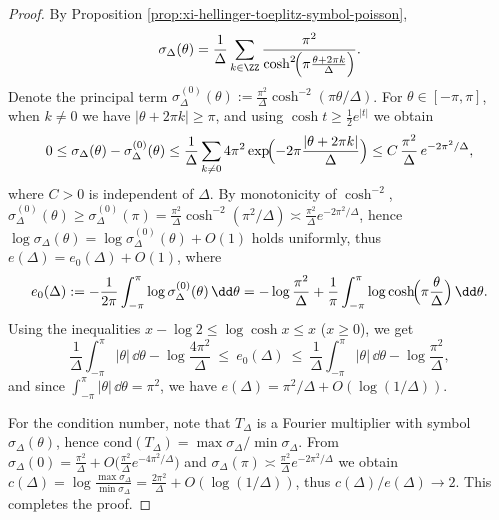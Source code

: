 \begin{proof}
By Proposition \ref{prop:xi-hellinger-toeplitz-symbol-poisson},
\[
\sigma_\Delta(\theta)=\frac{1}{\Delta}\sum_{k\in\ZZ}\frac{\pi^{2}}{\cosh^{2}\!\Bigl(\pi\frac{\theta+2\pi k}{\Delta}\Bigr)}.
\]
Denote the principal term
\(
\sigma_\Delta^{(0)}(\theta):=\frac{\pi^{2}}{\Delta}\cosh^{-2}(\pi\theta/\Delta)
\).
For \(\theta\in[-\pi,\pi]\), when \(k\neq0\) we have \(|\theta+2\pi k|\ge\pi\), and using \(\cosh t\ge \tfrac12 e^{|t|}\) we obtain
\[
0\le \sigma_\Delta(\theta)-\sigma_\Delta^{(0)}(\theta)
\le \frac{1}{\Delta}\sum_{k\neq0}4\pi^{2}\exp\!\Bigl(-2\pi\frac{|\theta+2\pi k|}{\Delta}\Bigr)
\le C\,\frac{\pi^{2}}{\Delta}\,e^{-2\pi^{2}/\Delta},
\]
where \(C>0\) is independent of \(\Delta\).
By monotonicity of \(\cosh^{-2}\),
\(
\sigma_\Delta^{(0)}(\theta)\ge \sigma_\Delta^{(0)}(\pi)=\frac{\pi^{2}}{\Delta}\cosh^{-2}(\pi^{2}/\Delta)
\asymp \frac{\pi^{2}}{\Delta}e^{-2\pi^{2}/\Delta}
\),
hence \(\log\sigma_\Delta(\theta)=\log\sigma_\Delta^{(0)}(\theta)+O(1)\) holds uniformly, thus \(e(\Delta)=e_0(\Delta)+O(1)\), where
\[
e_0(\Delta):=-\frac{1}{2\pi}\int_{-\pi}^{\pi}\log\sigma_\Delta^{(0)}(\theta)\,\dd\theta
=-\log\frac{\pi^{2}}{\Delta}+\frac{1}{\pi}\int_{-\pi}^{\pi}\log\cosh\!\Bigl(\pi\frac{\theta}{\Delta}\Bigr)\,\dd\theta.
\]
Using the inequalities \(x-\log2\le \log\cosh x\le x\) (\(x\ge0\)), we get
\[
\frac{1}{\Delta}\int_{-\pi}^{\pi}|\theta|\,\dd\theta-\log\frac{4\pi^{2}}{\Delta}
\ \le\ e_0(\Delta)\ \le\
\frac{1}{\Delta}\int_{-\pi}^{\pi}|\theta|\,\dd\theta-\log\frac{\pi^{2}}{\Delta},
\]
and since \(\int_{-\pi}^{\pi}|\theta|\,\dd\theta=\pi^{2}\), we have \(e(\Delta)=\pi^{2}/\Delta+O(\log(1/\Delta))\).
\par
For the condition number, note that \(T_\Delta\) is a Fourier multiplier with symbol \(\sigma_\Delta(\theta)\), hence \(\mathrm{cond}(T_\Delta)=\max\sigma_\Delta/\min\sigma_\Delta\).
From \(\sigma_\Delta(0)=\frac{\pi^{2}}{\Delta}+O\!\bigl(\frac{\pi^{2}}{\Delta}e^{-4\pi^{2}/\Delta}\bigr)\) and
\(
\sigma_\Delta(\pi)\asymp \frac{\pi^{2}}{\Delta}e^{-2\pi^{2}/\Delta}
\)
we obtain
\(
c(\Delta)=\log\frac{\max\sigma_\Delta}{\min\sigma_\Delta}
=\frac{2\pi^{2}}{\Delta}+O(\log(1/\Delta))
\),
thus \(c(\Delta)/e(\Delta)\to2\). This completes the proof.
\end{proof}

